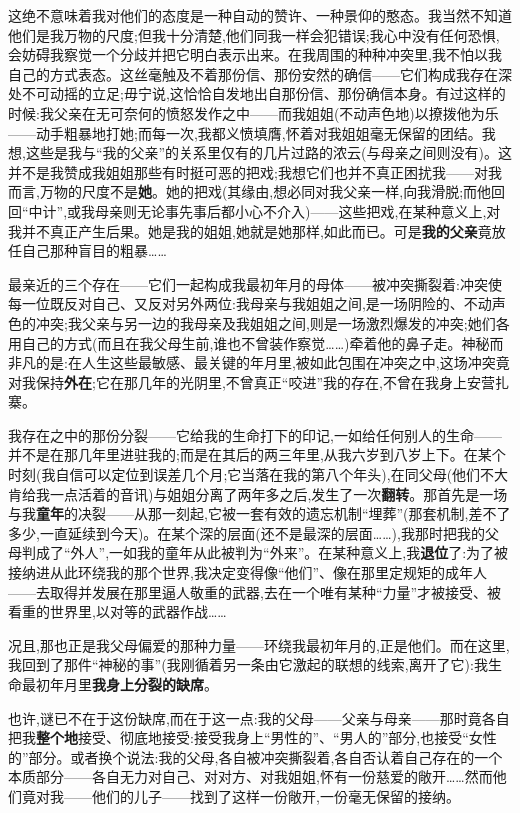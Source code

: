 这绝不意味着我对他们的态度是一种自动的赞许、一种景仰的憨态。我当然不知道他们是我万物的尺度;但我十分清楚,他们同我一样会犯错误;我心中没有任何恐惧,会妨碍我察觉一个分歧并把它明白表示出来。在我周围的种种冲突里,我不怕以我自己的方式表态。这丝毫触及不着那份信、那份安然的确信——它们构成我存在深处不可动摇的立足;毋宁说,这恰恰自发地出自那份信、那份确信本身。有过这样的时候:我父亲在无可奈何的愤怒发作之中——而我姐姐(不动声色地)以撩拨他为乐——动手粗暴地打她;而每一次,我都义愤填膺,怀着对我姐姐毫无保留的团结。我想,这些是我与“我的父亲”的关系里仅有的几片过路的浓云(与母亲之间则没有)。这并不是我赞成我姐姐那些有时挺可恶的把戏;我想它们也并不真正困扰我——对我而言,万物的尺度不是\textbf{她}。她的把戏(其缘由,想必同对我父亲一样,向我滑脱;而他回回“中计”,或我母亲则无论事先事后都小心不介入)——这些把戏,在某种意义上,对我并不真正产生后果。她是我的姐姐,她就是她那样,如此而已。可是\textbf{我的父亲}竟放任自己那种盲目的粗暴……

最亲近的三个存在——它们一起构成我最初年月的母体——被冲突撕裂着:冲突使每一位既\dmark{}反对自己、又反对另外两位:我母亲与我姐姐之间,是一场阴险的、不动声色的冲突;我父亲与另一边的我母亲及我姐姐之间,则是一场激烈爆发的冲突;她们各用自己的方式(而且在我父母生前,谁也不曾装作察觉……)牵着他的鼻子走。神秘而非凡的是:在人生这些最敏感、最关键的年月里,被如此包围在冲突之中,这场冲突竟对我保持\textbf{外在};它在那几年的光阴里,不曾真正“咬进”我的存在,不曾在我身上安营扎寨。

我存在之中的那份分裂——它给我的生命打下的印记,一如给任何别人的生命——并不是在那几年里进驻我的;而是在其后的两三年里,从我六岁到八岁上下。在某个时刻(我自信可以定位到误差几个月;它当落在我的第八个年头),在同父母(他们不大肯给我一点活着的音讯)与姐姐分离了两年多之后,发生了一次\textbf{翻转}。那首先是一场与我\textbf{童年}的决裂——从那一刻起,它被一套有效的遗忘机制“埋葬”(那套机制,差不了多少,一直延续到今天)。在某个深的层面(还不是最深的层面……),我那时把我的父母判成了“外人”,一如我的童年从此被判为“外来”。在某种意义上,我\textbf{退位}了:为了被接纳进从此环绕我的那个世界,我决定变得像“他们”、像在那里定规矩的成年人——去取得并发展在那里逼人敬重的武器,去在一个唯有某种“力量”才被接受、被看重的世界里,以对等的武器作战……

况且,那也正是我父母偏爱的那种力量——环绕我最初年月的,正是他们。而在这里,我回到了那件“神秘的事”(我刚循着另一条由它激起的联想的线索,离开了它):我生命最初年月里\textbf{我身上分裂的缺席}。

也许,谜已不在于这份缺席,而在于这一点:我的父母——父亲与母亲——那时竟各自把我\textbf{整个地}接受、彻底地接受:接受我身上“男性的”、“男人的”部分,也接受“女性的”部分。或者换个说法:我的父母,各自被冲突撕裂着,各自否认着自己存在的一个本质部分——各自无力对自己、对对方、对我姐姐,怀有一份慈爱的敞开……然而他们竟对我——他们的儿子\dmark{}——找到了这样一份敞开,一份毫无保留的接纳。

